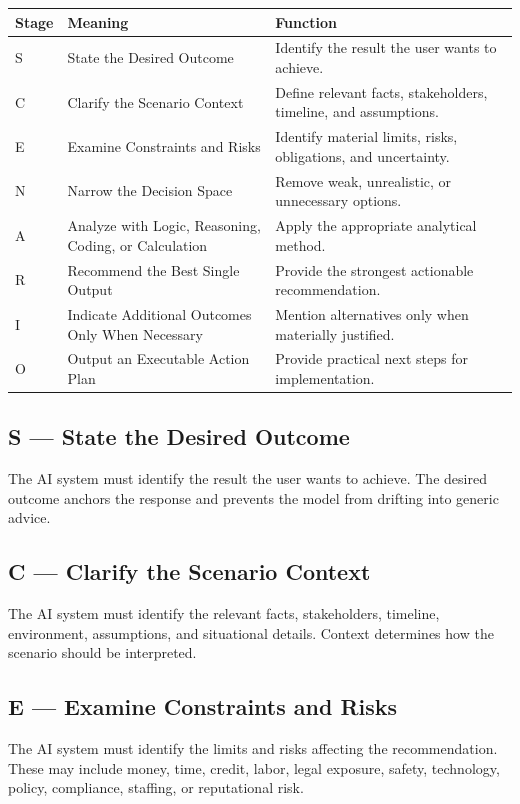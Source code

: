 \documentclass[11pt]{article}
\begin{document}
\begin{longtable}{p{} p{} p{}}
\toprule
\textbf{Stage} & \textbf{Meaning} & \textbf{Function} \\
\midrule
S & State the Desired Outcome & Identify the result the user wants to achieve. \\
C & Clarify the Scenario Context & Define relevant facts, stakeholders, timeline, and assumptions. \\
E & Examine Constraints and Risks & Identify material limits, risks, obligations, and uncertainty. \\
N & Narrow the Decision Space & Remove weak, unrealistic, or unnecessary options. \\
A & Analyze with Logic, Reasoning, Coding, or Calculation & Apply the appropriate analytical method. \\
R & Recommend the Best Single Output & Provide the strongest actionable recommendation. \\
I & Indicate Additional Outcomes Only When Necessary & Mention alternatives only when materially justified. \\
O & Output an Executable Action Plan & Provide practical next steps for implementation. \\
\bottomrule
\end{longtable}

\subsection{S --- State the Desired Outcome}

The AI system must identify the result the user wants to achieve. The desired outcome anchors the response and prevents the model from drifting into generic advice.

\subsection{C --- Clarify the Scenario Context}

The AI system must identify the relevant facts, stakeholders, timeline, environment, assumptions, and situational details. Context determines how the scenario should be interpreted.

\subsection{E --- Examine Constraints and Risks}

The AI system must identify the limits and risks affecting the recommendation. These may include money, time, credit, labor, legal exposure, safety, technology, policy, compliance, staffing, or reputational risk.
\end{document}
